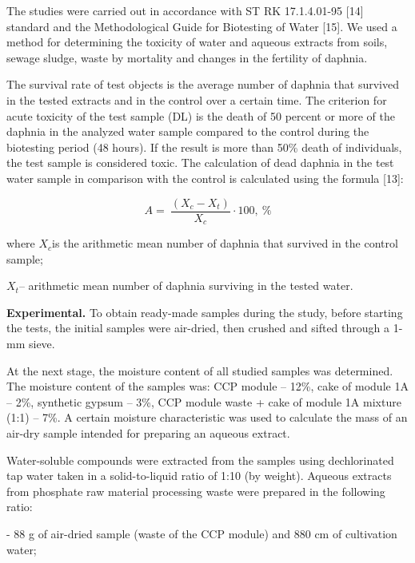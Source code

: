 \begin{multicols}{2}

The studies were carried out in accordance with ST RK 17.1.4.01-95
{[}14{]} standard and the Methodological Guide for Biotesting of Water
{[}15{]}. We used a method for determining the toxicity of water and
aqueous extracts from soils, sewage sludge, waste by mortality and
changes in the fertility of daphnia.

The survival rate of test objects is the average number of daphnia that
survived in the tested extracts and in the control over a certain time.
The criterion for acute toxicity of the test sample
(DL) is the death of 50 percent or more of the daphnia
in the analyzed water sample compared to the control during the
biotesting period (48 hours). If the result is more than 50\% death of
individuals, the test sample is considered toxic. The calculation of
dead daphnia in the test water sample in comparison with the control is
calculated using the formula {[}13{]}:

\begin{equation}
A = \ \frac{(X_{c} - X_{t})}{X_{c}} \cdot 100,\ \%
\end{equation}

where \(X_{c}\)is the arithmetic mean number of daphnia that survived in
the control sample;

\(X_{t}\)-- arithmetic mean number of daphnia surviving in the tested
water.

{\bfseries Experimental.} To obtain ready-made samples during the study,
before starting the tests, the initial samples were air-dried, then
crushed and sifted through a 1-mm sieve.

At the next stage, the moisture content of all studied samples was
determined. The moisture content of the samples was: CCP module -- 12\%,
cake of module 1A -- 2\%, synthetic gypsum -- 3\%, CCP module waste +
cake of module 1A mixture (1:1) -- 7\%. A certain moisture
characteristic was used to calculate the mass of an air-dry sample
intended for preparing an aqueous extract.

Water-soluble compounds were extracted from the samples using
dechlorinated tap water taken in a solid-to-liquid ratio of 1:10 (by
weight). Aqueous extracts from phosphate raw material processing waste
were prepared in the following ratio:

- 88 g of air-dried sample (waste of the CCP module) and 880
cm of cultivation water;


\end{multicols}
